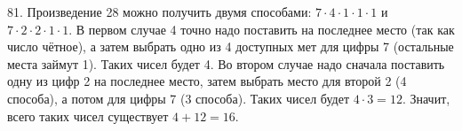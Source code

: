 81. Произведение 28 можно получить двумя способами: $7\cdot4\cdot1\cdot1\cdot1$ и $7\cdot2\cdot2\cdot1\cdot1.$ В первом случае 4 точно надо поставить на последнее место (так как число чётное), а затем выбрать одно из 4 доступных мет для цифры 7 (остальные места займут 1). Таких чисел будет 4. Во втором случае надо сначала поставить одну из цифр 2 на последнее место, затем выбрать место для второй 2 (4 способа), а потом для цифры 7 (3 способа). Таких чисел будет $4\cdot3=12.$ Значит, всего таких чисел существует $4+12=16.$\\
